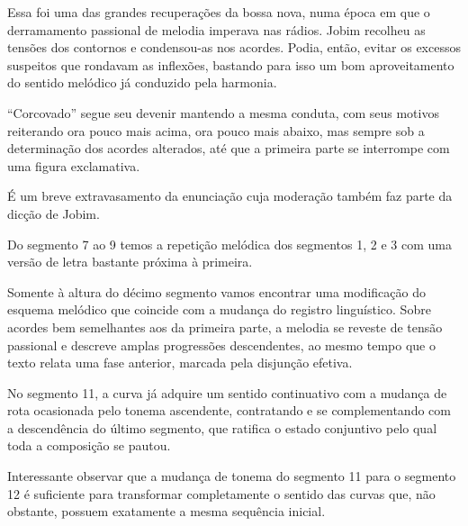 Essa foi uma das grandes recuperações da bossa nova, numa época em que o
derramamento passional de melodia imperava nas rádios. Jobim recolheu as
tensões dos contornos e condensou-as nos acordes. Podia, então, evitar
os excessos suspeitos que rondavam as inflexões, bastando para isso um
bom aproveitamento do sentido melódico já conduzido pela harmonia.

``Corcovado'' segue seu devenir mantendo a mesma conduta, com seus motivos
reiterando ora pouco mais acima, ora pouco mais abaixo, mas sempre sob a
determinação dos acordes alterados, até que a primeira parte se
interrompe com uma figura exclamativa.


É um breve extravasamento da enunciação cuja moderação também faz parte
da dicção de Jobim.

Do segmento 7 ao 9 temos a repetição melódica dos segmentos 1, 2 e 3 com
uma versão de letra bastante próxima à primeira.

Somente à altura do décimo segmento vamos encontrar uma modificação do
esquema melódico que coincide com a mudança do registro linguístico.
Sobre acordes bem semelhantes aos da primeira parte, a melodia se
reveste de tensão passional e descreve amplas progressões descendentes,
ao mesmo tempo que o texto relata uma fase anterior, marcada pela
disjunção efetiva.


No segmento 11, a curva já adquire um sentido continuativo com a mudança
de rota ocasionada pelo tonema ascendente, contratando e se
complementando com a descendência do último segmento, que ratifica o
estado conjuntivo pelo qual toda a composição se pautou.


Interessante observar que a mudança de tonema do segmento 11 para o
segmento 12 é suficiente para transformar completamente o sentido das
curvas que, não obstante, possuem exatamente a mesma sequência inicial.

